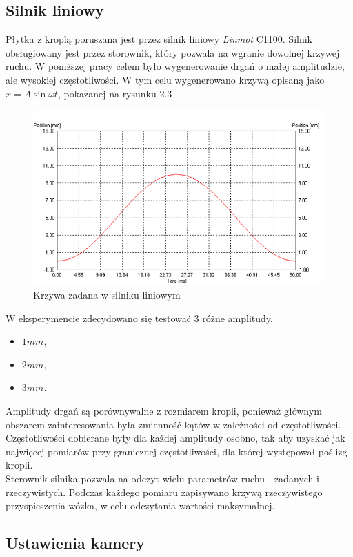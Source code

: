 \subsection{Silnik liniowy}

Płytka z kroplą poruszana jest przez silnik liniowy \textit{Linmot} C1100. Silnik obsługiowany jest przez storownik, który pozwala na wgranie dowolnej krzywej ruchu. W poniższej pracy celem było wygenerowanie drgań o małej amplitudzie, ale wysokiej częstotliwości. W tym celu wygenerowano krzywą opisaną jako $x = A\sin{\omega t}$, pokazanej na rysunku 2.3

\begin{figure}[!h]
    \label{fig:poślizg}
    \centering \includegraphics[width=0.8\linewidth]{img/curve.png}
    \caption{Krzywa zadana w silniku liniowym}
\end{figure}

W eksperymencie zdecydowano się testować 3 różne amplitudy.
\begin{itemize}
    \item $1mm$,
    \item $2mm$,
    \item $3mm$.
\end{itemize}

Amplitudy drgań są porównywalne z rozmiarem kropli, ponieważ głównym obszarem zainteresowania była zmienność kątów w zależności od częstotliwości. Częstotliwości dobierane były dla każdej amplitudy osobno, tak aby uzyskać jak najwięcej pomiarów przy granicznej częstotliwości, dla której występował poślizg kropli.\\

Sterownik silnika pozwala na odczyt wielu parametrów ruchu - zadanych i rzeczywistych. Podczas każdego pomiaru zapisywano krzywą rzeczywistego przyspieszenia wózka, w celu odczytania wartości maksymalnej. 

\newpage

\subsection{Ustawienia kamery}





